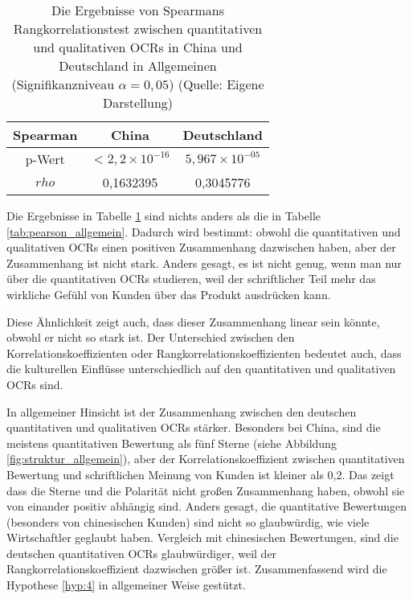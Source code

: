 \begin{table}[h]
\centering
\begin{tabular}{|c|c|c|}
\hline
Spearman & China             & Deutschland \\ \hline
p-Wert   & $< 2,2 \times 10^{-16}$ & $5,967 \times 10^{-05}$   \\ \hline
$rho$      & 0,1632395         & 0,3045776   \\ \hline
\end{tabular}
\caption[Die Ergebnisse von Spearmans Rangkorrelationstest zwischen quantitativen und qualitativen OCRs in China und Deutschland in Allgemeinen]{Die Ergebnisse von Spearmans Rangkorrelationstest zwischen quantitativen und qualitativen \ac{OCRs} in China und Deutschland in Allgemeinen (Signifikanzniveau $\alpha = 0,05$) (Quelle: Eigene Darstellung)}
\label{tab:spearman_allgemein}
\end{table}

Die Ergebnisse in Tabelle \ref{tab:spearman_allgemein} sind nichts anders als die in Tabelle \ref{tab:pearson_allgemein}. Dadurch wird bestimmt: obwohl die quantitativen und qualitativen \ac{OCRs} einen positiven Zusammenhang dazwischen haben, aber der Zusammenhang ist nicht stark. Anders gesagt, es ist nicht genug, wenn man nur über die quantitativen \ac{OCRs} studieren, weil der schriftlicher Teil mehr das wirkliche Gefühl von Kunden über das Produkt ausdrücken kann. 

Diese Ähnlichkeit zeigt auch, dass dieser Zusammenhang linear sein könnte, obwohl er nicht so stark ist. Der Unterschied zwischen den Korrelationskoeffizienten oder Rangkorrelationskoeffizienten bedeutet auch, dass die kulturellen Einflüsse unterschiedlich auf den quantitativen und qualitativen \ac{OCRs} sind.

In allgemeiner Hinsicht ist der Zusammenhang zwischen den deutschen quantitativen und qualitativen \ac{OCRs} stärker. Besonders bei China, sind die meistens quantitativen Bewertung als fünf Sterne (siehe Abbildung \ref{fig:struktur_allgemein}), aber der Korrelationskoeffizient zwischen quantitativen Bewertung und schriftlichen Meinung von Kunden ist kleiner als 0,2. Das zeigt dass die Sterne und die Polarität nicht großen Zusammenhang haben, obwohl sie von einander positiv abhängig sind. Anders gesagt, die quantitative Bewertungen (besonders von chinesischen Kunden) sind nicht so glaubwürdig, wie viele Wirtschaftler geglaubt haben. Vergleich mit chinesischen Bewertungen, sind die deutschen quantitativen \ac{OCRs} glaubwürdiger, weil der Rangkorrelationskoeffizient dazwischen größer ist. Zusammenfassend wird die Hypothese \ref{hyp:4} in allgemeiner Weise gestützt.

